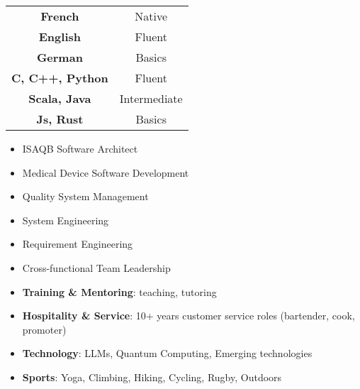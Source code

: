\threecolumnsection
{
\vspace{1em}
\hspace*{-5mm}\begin{tabular}{cc}
  \textbf{French}  & Native \\
  \textbf{English}   & Fluent \\
  \textbf{German} & Basics \\
  \textbf{C, C++, Python} & Fluent \\
  \textbf{Scala, Java} & Intermediate \\
  \textbf{Js, Rust} & Basics
\end{tabular}
}
{
\vspace{1em}
\begin{itemize}
    \item ISAQB Software Architect
	\item Medical Device Software Development
    \item Quality System Management
    \item System Engineering
    \item Requirement Engineering
    \item Cross-functional Team Leadership
\end{itemize}
}
{
\vspace{1em}
\hspace*{-5mm}\begin{itemize}
	\item \textbf{Training \& Mentoring}: teaching, tutoring
	\item \textbf{Hospitality \& Service}: 10+ years customer service roles (bartender, cook, promoter)
    \item \textbf{Technology}: LLMs, Quantum Computing, Emerging technologies
    \item \textbf{Sports}: Yoga, Climbing, Hiking, Cycling, Rugby, Outdoors
\end{itemize}
}